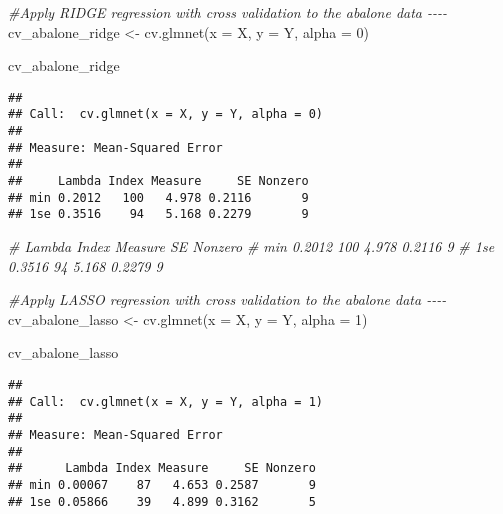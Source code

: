 \documentclass[
]{article}
\newenvironment{Shaded}{\begin{snugshade}}{\end{snugshade}}
\newcommand{\AttributeTok}[1]{\textcolor[rgb]{0.77,0.63,0.00}{#1}}
\newcommand{\CommentTok}[1]{\textcolor[rgb]{0.56,0.35,0.01}{\textit{#1}}}
\newcommand{\DecValTok}[1]{\textcolor[rgb]{0.00,0.00,0.81}{#1}}
\newcommand{\FunctionTok}[1]{\textcolor[rgb]{0.00,0.00,0.00}{#1}}
\newcommand{\NormalTok}[1]{#1}
\newcommand{\OtherTok}[1]{\textcolor[rgb]{0.56,0.35,0.01}{#1}}
\begin{document}
\begin{Shaded}
\begin{Highlighting}[]
\CommentTok{\#Apply RIDGE regression with cross validation to the abalone data {-}{-}{-}{-}}
\NormalTok{cv\_abalone\_ridge }\OtherTok{\textless{}{-}} \FunctionTok{cv.glmnet}\NormalTok{(}\AttributeTok{x =}\NormalTok{ X,  }
                              \AttributeTok{y =}\NormalTok{ Y, }
                              \AttributeTok{alpha =} \DecValTok{0}\NormalTok{)}

\NormalTok{cv\_abalone\_ridge}
\end{Highlighting}
\end{Shaded}

\begin{verbatim}
## 
## Call:  cv.glmnet(x = X, y = Y, alpha = 0) 
## 
## Measure: Mean-Squared Error 
## 
##     Lambda Index Measure     SE Nonzero
## min 0.2012   100   4.978 0.2116       9
## 1se 0.3516    94   5.168 0.2279       9
\end{verbatim}

\begin{Shaded}
\begin{Highlighting}[]
\CommentTok{\#       Lambda   Index   Measure     SE     Nonzero}
\CommentTok{\# min   0.2012    100    4.978     0.2116       9}
\CommentTok{\# 1se   0.3516    94     5.168     0.2279       9}


\CommentTok{\#Apply LASSO regression with cross validation to the abalone data {-}{-}{-}{-}}
\NormalTok{cv\_abalone\_lasso }\OtherTok{\textless{}{-}} \FunctionTok{cv.glmnet}\NormalTok{(}\AttributeTok{x =}\NormalTok{ X,  }
                              \AttributeTok{y =}\NormalTok{ Y, }
                              \AttributeTok{alpha =} \DecValTok{1}\NormalTok{)}

\NormalTok{cv\_abalone\_lasso}
\end{Highlighting}
\end{Shaded}

\begin{verbatim}
## 
## Call:  cv.glmnet(x = X, y = Y, alpha = 1) 
## 
## Measure: Mean-Squared Error 
## 
##      Lambda Index Measure     SE Nonzero
## min 0.00067    87   4.653 0.2587       9
## 1se 0.05866    39   4.899 0.3162       5
\end{verbatim}
\end{document}

